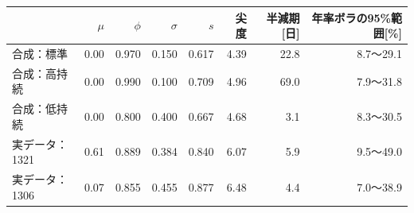 \begin{tabular}{lrrrrrrr}
\toprule
 & $\mu$ & $\phi$ & $\sigma$ & $s$ & 尖度 & 半減期[日] & 年率ボラの95\%範囲[\%] \\
\midrule
合成：標準 & 0.00 & 0.970 & 0.150 & 0.617 & 4.39 & 22.8 & 8.7〜29.1 \\
合成：高持続 & 0.00 & 0.990 & 0.100 & 0.709 & 4.96 & 69.0 & 7.9〜31.8 \\
合成：低持続 & 0.00 & 0.800 & 0.400 & 0.667 & 4.68 & 3.1 & 8.3〜30.5 \\
\addlinespace
実データ：1321 & 0.61 & 0.889 & 0.384 & 0.840 & 6.07 & 5.9 & 9.5〜49.0 \\
実データ：1306 & 0.07 & 0.855 & 0.455 & 0.877 & 6.48 & 4.4 & 7.0〜38.9 \\
\bottomrule
\end{tabular}

